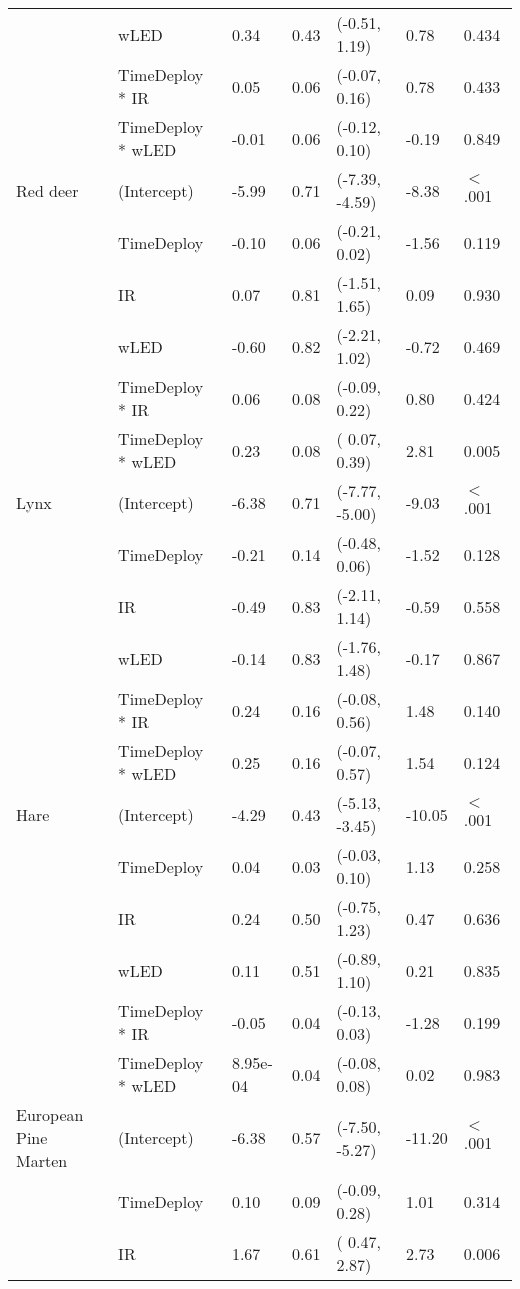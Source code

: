 \begin{table}[ht]
\begin{tabular}{lllllll}
   & wLED & 0.34 & 0.43 & (-0.51,  1.19) & 0.78 & 0.434  \\ 
   & TimeDeploy * IR & 0.05 & 0.06 & (-0.07,  0.16) & 0.78 & 0.433  \\ 
   & TimeDeploy * wLED & -0.01 & 0.06 & (-0.12,  0.10) & -0.19 & 0.849  \\ 
  Red deer & (Intercept) & -5.99 & 0.71 & (-7.39, -4.59) & -8.38 & $<$ .001 \\ 
   & TimeDeploy & -0.10 & 0.06 & (-0.21,  0.02) & -1.56 & 0.119  \\ 
   & IR & 0.07 & 0.81 & (-1.51,  1.65) & 0.09 & 0.930  \\ 
   & wLED & -0.60 & 0.82 & (-2.21,  1.02) & -0.72 & 0.469  \\ 
   & TimeDeploy * IR & 0.06 & 0.08 & (-0.09,  0.22) & 0.80 & 0.424  \\ 
   & TimeDeploy * wLED & 0.23 & 0.08 & ( 0.07,  0.39) & 2.81 & 0.005  \\ 
  Lynx & (Intercept) & -6.38 & 0.71 & (-7.77, -5.00) & -9.03 & $<$ .001 \\ 
   & TimeDeploy & -0.21 & 0.14 & (-0.48,  0.06) & -1.52 & 0.128  \\ 
   & IR & -0.49 & 0.83 & (-2.11,  1.14) & -0.59 & 0.558  \\ 
   & wLED & -0.14 & 0.83 & (-1.76,  1.48) & -0.17 & 0.867  \\ 
   & TimeDeploy * IR & 0.24 & 0.16 & (-0.08,  0.56) & 1.48 & 0.140  \\ 
   & TimeDeploy * wLED & 0.25 & 0.16 & (-0.07,  0.57) & 1.54 & 0.124  \\ 
  Hare & (Intercept) & -4.29 & 0.43 & (-5.13, -3.45) & -10.05 & $<$ .001 \\ 
   & TimeDeploy & 0.04 & 0.03 & (-0.03,  0.10) & 1.13 & 0.258  \\ 
   & IR & 0.24 & 0.50 & (-0.75,  1.23) & 0.47 & 0.636  \\ 
   & wLED & 0.11 & 0.51 & (-0.89,  1.10) & 0.21 & 0.835  \\ 
   & TimeDeploy * IR & -0.05 & 0.04 & (-0.13,  0.03) & -1.28 & 0.199  \\ 
   & TimeDeploy * wLED & 8.95e-04 & 0.04 & (-0.08,  0.08) & 0.02 & 0.983  \\ 
  European Pine Marten & (Intercept) & -6.38 & 0.57 & (-7.50, -5.27) & -11.20 & $<$ .001 \\ 
   & TimeDeploy & 0.10 & 0.09 & (-0.09,  0.28) & 1.01 & 0.314  \\ 
   & IR & 1.67 & 0.61 & ( 0.47,  2.87) & 2.73 & 0.006  \\ 

\end{tabular}
\end{table}
